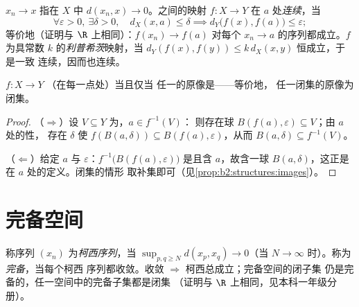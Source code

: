 \begin{definition}[极限与连续]\label{def:b2:metric:continuity}
$x_n \to x$ 指在 $X$ 中 $d(x_n, x) \to 0$。之间的映射 $f \colon X \to Y$
在 $a$ 处\emph{连续}，当
\[
\forall \varepsilon > 0,\ \exists\delta > 0,\quad
d_X(x, a) \leq \delta \implies d_Y\bigl(f(x), f(a)\bigr) \leq
\varepsilon ;
\]
等价地（证明与 $\R$ 上相同）：$f(x_n) \to f(a)$ 对每个
$x_n \to a$ 的序列都成立。$f$ 为具常数 $k$ 的\emph{利普希茨}映射，当
$d_Y(f(x), f(y)) \leq k\, d_X(x, y)$ 恒成立，于是一致
连续，因而也连续。
\end{definition}

\begin{theorem}[连续性的整体刻画]\label{thm:b2:metric:globalcontinuity}
$f \colon X \to Y$ （在每一点处）当且仅当
任一的原像是——等价地，
任一闭集的原像为闭集。
\end{theorem}

\begin{proof}
（$\Rightarrow$）设 $V \subseteq Y$ 为，$a \in f^{-1}(V)$：
则存在球 $B(f(a), \varepsilon) \subseteq V$；由 $a$ 处的性，
存在 $\delta$ 使 $f(B(a, \delta)) \subseteq B(f(a),
\varepsilon)$，从而 $B(a, \delta) \subseteq f^{-1}(V)$。

（$\Leftarrow$）给定 $a$ 与 $\varepsilon$：$f^{-1}\bigl(B(f(a),
\varepsilon)\bigr)$ 是且含 $a$，故含一球
$B(a, \delta)$，这正是在 $a$ 处的定义。闭集的情形
取补集即可（见\cref{prop:b2:structures:images}）。
\end{proof}

\section{完备空间}

\begin{definition}\label{def:b2:metric:complete}
称序列 $(x_n)$ 为\emph{柯西序列}，当 $\sup_{p, q \geq N} d(x_p,
x_q) \to 0$（当 $N \to \infty$ 时）。称为
\emph{完备}，当每个柯西
序列都收敛。收敛 $\Rightarrow$ 柯西总成立；完备空间的闭子集
仍是完备的，任一空间中的完备子集都是闭集
（证明与 $\R$ 上相同，见本科一年级分册）。
\end{definition}

